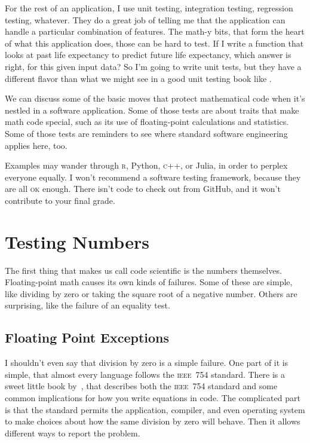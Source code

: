 \documentclass[fleqn,10pt]{olplainarticle}
\newcommand{\rlang}{\textsc{r}\xspace}
\newcommand{\cpp}{\textsc{c}++\xspace}
\newcommand{\ieee}{\textsc{ieee}\xspace}
\begin{document}
For the rest of an application, I use unit testing, integration testing, regression
testing, whatever. They do a great job of telling me that the application can handle
a particular combination of features. The math-y bits, that form the heart of what
this application does, those can be hard to test. If I write a function that looks
at past life expectancy to predict future life expectancy, which answer is right,
for this given input data? So I'm going to write unit tests, but they have a different
flavor than what we might see in a good unit testing book like \cite{jorgensen2013}.

We can discuss some of the basic moves that protect mathematical code when
it's nestled in a software application. Some of those tests are about traits
that make math code special, such as its use of floating-point calculations and
statistics. Some of those tests are reminders to see where standard software engineering
applies here, too.

Examples may wander through \rlang, Python, \cpp, or Julia, in order to perplex everyone
equally. I won't recommend a software testing framework, because they are all \textsc{ok}
enough. There isn't code to check out from GitHub, and it won't contribute to your final grade.


\section{Testing Numbers}\label{sec:ieee-numbers}

The first thing that makes us call code scientific is the numbers themselves.
Floating-point math causes its own kinds of failures. Some of these are simple,
like dividing by zero or taking the square root of a negative number.
Others are surprising, like the failure of an equality test.

\subsection{Floating Point Exceptions}
I shouldn't even say that division by zero is a simple failure.
One part of it is simple, that almost every language follows the
\ieee~754 standard. There is a sweet little book by~\cite{overton2001numerical},
that describes both the \ieee~754 standard
and some common implications for how you write equations in code.
The complicated part is that the standard permits the application, compiler,
and even operating system to make choices about how the same division
by zero will behave. Then it allows different ways to report the problem.
\end{document}

